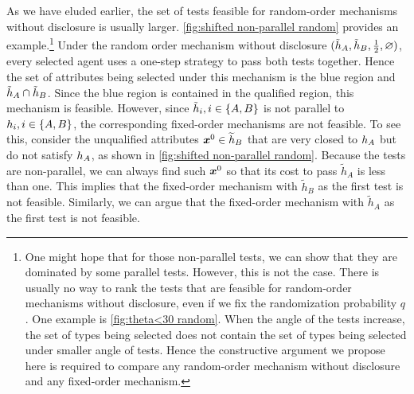 As we have eluded earlier, the set of tests feasible for random-order mechanisms without disclosure is usually larger. \cref{fig:shifted non-parallel random} provides an example.\footnote{One might hope that for those non-parallel tests, we can show that they are dominated by some parallel tests. 
However, this is not the case.
There is usually no way to rank the  tests that are feasible for random-order mechanisms without disclosure, even if we fix the randomization probability $q$.
 One example is \cref{fig:theta<30 random}. When the angle of the tests increase, the set of types being selected does not contain the set of types being selected under smaller angle of tests.
 Hence the constructive argument we propose here is required to compare any random-order mechanism without disclosure and any fixed-order mechanism.} 
Under the random order mechanism without disclosure $ (\tilde{h}_A,\tilde {h}_B,\frac12,\varnothing)$, every selected agent uses a one-step strategy to pass both tests together. Hence the set of attributes being selected under this mechanism is the blue region and $\tilde{h}_A\cap\tilde {h}_B$.
Since the blue region is contained in the qualified region, this  mechanism is feasible.
However, since $\tilde{h}_i,i\in\{A,B\}$ is not parallel to $h_i,i\in\{A,B\}$, the corresponding fixed-order mechanisms are not feasible.
To see this, consider the unqualified attributes  $\boldsymbol{x}^0\in \widetilde h_B$ that are very closed to $h_A$ but do not satisfy $h_A$,  as shown in \cref{fig:shifted non-parallel random}.
Because the tests are non-parallel, we can always find such $\boldsymbol{x}^0$ so that its cost to pass $\widetilde h_A$ is less than one.
This implies that the fixed-order mechanism with $\widetilde h_B$ as the first test is not  feasible.
Similarly, we can argue that the fixed-order mechanism with $\widetilde h_A$ as the first test is not  feasible.


